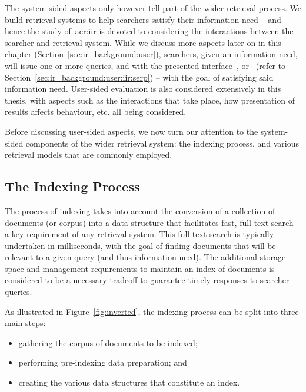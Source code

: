 The system-sided aspects only however tell part of the wider retrieval process. We build retrieval systems to help searchers satisfy their information need -- and hence the study of~\gls{acr:iir} is devoted to considering the interactions between the searcher and retrieval system. While we discuss more  aspects later on in this chapter (Section~\ref{sec:ir_background:user}), searchers, given an information need, will issue one or more queries, and  with the presented interface~\citep{ingwersen2005theturn}, or~ (refer to Section~\ref{sec:ir_background:user:iir:serp}) -- with the goal of satisfying said information need. User-sided evaluation is also considered extensively in this thesis, with aspects such as the interactions that take place, how presentation of results affects behaviour, etc. all being considered.

Before discussing user-sided aspects, we now turn our attention to the system-sided components of the wider retrieval system: the indexing process, and various retrieval models that are commonly employed.

\subsection{The Indexing Process}\label{sec:ir_background:basics:indexing}
The process of indexing takes into account the conversion of a collection of documents (or corpus) into a data structure that facilitates fast, full-text search -- a key requirement of any retrieval system. This full-text search is typically undertaken in milliseconds, with the goal of finding documents that will be relevant to a given query (and thus information need). The additional storage space and management requirements to maintain an index of documents is considered to be a necessary tradeoff to guarantee timely responses to searcher queries.

As illustrated in Figure~\ref{fig:inverted}, the indexing process can be split into three main steps:

\begin{itemize}
    \item{gathering the corpus of documents to be indexed;}
    \item{performing pre-indexing data preparation; and}
    \item{creating the various data structures that constitute an index.}
\end{itemize}

